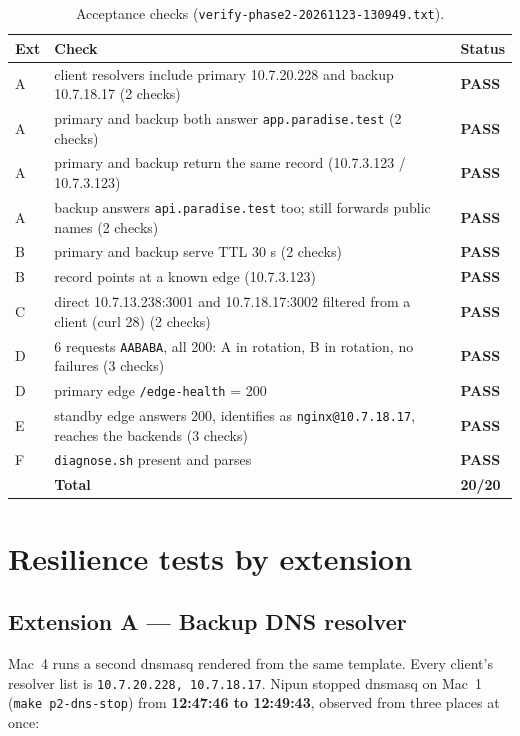 \documentclass[11pt,a4paper]{article}
\newcommand{\pass}{\textcolor{lmGreen}{\textbf{PASS}}}
\begin{document}
\begin{table}[!htbp]
\centering
\caption{Acceptance checks (\texttt{verify-phase2-20261123-130949.txt}).}
{\small
\begin{tabular}{@{}L{0.6cm}L{11.6cm}L{1.4cm}@{}}
\toprule
\textbf{Ext} & \textbf{Check} & \textbf{Status} \\
\midrule
A & client resolvers include primary 10.7.20.228 and backup 10.7.18.17 (2 checks) & \pass \\
A & primary and backup both answer \texttt{app.paradise.test} (2 checks) & \pass \\
A & primary and backup return the same record (10.7.3.123 / 10.7.3.123) & \pass \\
A & backup answers \texttt{api.paradise.test} too; still forwards public names (2 checks) & \pass \\
B & primary and backup serve TTL 30 s (2 checks) & \pass \\
B & record points at a known edge (10.7.3.123) & \pass \\
C & direct 10.7.13.238:3001 and 10.7.18.17:3002 filtered from a client (curl 28) (2 checks) & \pass \\
D & 6 requests \texttt{AABABA}, all 200: A in rotation, B in rotation, no failures (3 checks) & \pass \\
D & primary edge \texttt{/edge-health} = 200 & \pass \\
E & standby edge answers 200, identifies as \texttt{nginx@10.7.18.17}, reaches the backends (3 checks) & \pass \\
F & \texttt{diagnose.sh} present and parses & \pass \\
\midrule
 & \textbf{Total} & \textbf{20/20} \\
\bottomrule
\end{tabular}}
\end{table}

\section{Resilience tests by extension}

\subsection{Extension A --- Backup DNS resolver}
Mac~4 runs a second dnsmasq rendered from the same template. Every client's resolver list is
\texttt{10.7.20.228, 10.7.18.17}. Nipun stopped dnsmasq on Mac~1 (\texttt{make p2-dns-stop}) from
\textbf{12:47:46 to 12:49:43}, observed from three places at once:
\end{document}
